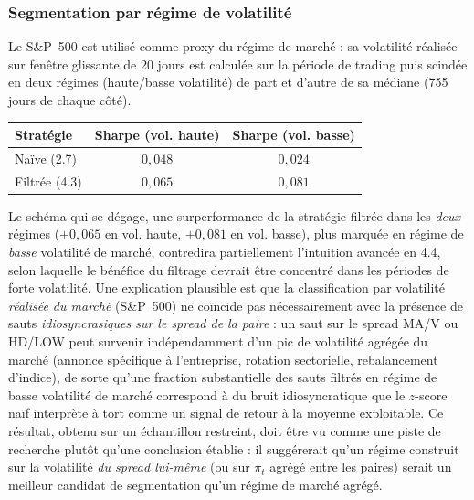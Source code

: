 \documentclass{article}
\begin{document}
\subsubsection*{Segmentation par régime de volatilité}
Le S\&P~500 est utilisé comme proxy du régime de marché : sa volatilité réalisée sur fenêtre glissante de 20 jours est calculée sur la période de trading puis scindée en deux régimes (haute/basse volatilité) de part et d'autre de sa médiane (755 jours de chaque côté).
\begin{center}
\begin{tabular}{lcc}
\toprule
Stratégie & Sharpe (vol. haute) & Sharpe (vol. basse) \\
\midrule
Naïve (2.7) & $0{,}048$ & $0{,}024$ \\
Filtrée (4.3) & $0{,}065$ & $0{,}081$ \\
\bottomrule
\end{tabular}
\end{center}
Le schéma qui se dégage, une surperformance de la stratégie filtrée dans les \emph{deux} régimes ($+0{,}065$ en vol. haute, $+0{,}081$ en vol. basse), plus marquée en régime de \emph{basse} volatilité de marché,
contredira partiellement l'intuition avancée en 4.4, selon laquelle le bénéfice du filtrage devrait être concentré dans les périodes de forte volatilité. Une explication plausible est que la classification par volatilité \emph{réalisée du marché} (S\&P~500) ne coïncide pas nécessairement avec la présence de sauts \emph{idiosyncrasiques sur le spread de la paire} : un saut sur le spread MA/V ou HD/LOW peut survenir indépendamment d'un pic de volatilité agrégée du marché (annonce spécifique à l'entreprise, rotation sectorielle, rebalancement d'indice), de sorte qu'une fraction substantielle des sauts filtrés en régime de basse volatilité de marché correspond à du bruit idiosyncratique que le $z$-score naïf interprète à tort comme un signal de retour à la moyenne exploitable. Ce résultat, obtenu sur un échantillon restreint, doit être vu comme une piste de recherche plutôt qu'une conclusion établie : il suggérerait qu'un régime construit sur la volatilité \emph{du spread lui-même} (ou sur $\pi_t$ agrégé entre les paires) serait un meilleur candidat de segmentation qu'un régime de marché agrégé.
\end{document}
